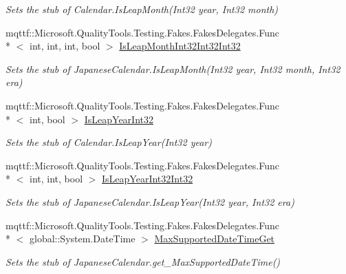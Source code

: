 \begin{DoxyCompactItemize}
\begin{DoxyCompactList}\small\item\em Sets the stub of Calendar.\-Is\-Leap\-Month(\-Int32 year, Int32 month)\end{DoxyCompactList}\item 
mqttf\-::\-Microsoft.\-Quality\-Tools.\-Testing.\-Fakes.\-Fakes\-Delegates.\-Func\\*
$<$ int, int, int, bool $>$ \hyperlink{class_system_1_1_globalization_1_1_fakes_1_1_stub_japanese_calendar_a881990b2e554e0de19a3dc76a23b2a61}{Is\-Leap\-Month\-Int32\-Int32\-Int32}
\begin{DoxyCompactList}\small\item\em Sets the stub of Japanese\-Calendar.\-Is\-Leap\-Month(\-Int32 year, Int32 month, Int32 era)\end{DoxyCompactList}\item 
mqttf\-::\-Microsoft.\-Quality\-Tools.\-Testing.\-Fakes.\-Fakes\-Delegates.\-Func\\*
$<$ int, bool $>$ \hyperlink{class_system_1_1_globalization_1_1_fakes_1_1_stub_japanese_calendar_ab1f0aa6c476804ff4102ee1860db8593}{Is\-Leap\-Year\-Int32}
\begin{DoxyCompactList}\small\item\em Sets the stub of Calendar.\-Is\-Leap\-Year(\-Int32 year)\end{DoxyCompactList}\item 
mqttf\-::\-Microsoft.\-Quality\-Tools.\-Testing.\-Fakes.\-Fakes\-Delegates.\-Func\\*
$<$ int, int, bool $>$ \hyperlink{class_system_1_1_globalization_1_1_fakes_1_1_stub_japanese_calendar_a3cf93b52b90cd9e36d9d6d2b6b4292cf}{Is\-Leap\-Year\-Int32\-Int32}
\begin{DoxyCompactList}\small\item\em Sets the stub of Japanese\-Calendar.\-Is\-Leap\-Year(\-Int32 year, Int32 era)\end{DoxyCompactList}\item 
mqttf\-::\-Microsoft.\-Quality\-Tools.\-Testing.\-Fakes.\-Fakes\-Delegates.\-Func\\*
$<$ global\-::\-System.\-Date\-Time $>$ \hyperlink{class_system_1_1_globalization_1_1_fakes_1_1_stub_japanese_calendar_a1e565991c545d6f099849c8d8c14e859}{Max\-Supported\-Date\-Time\-Get}
\begin{DoxyCompactList}\small\item\em Sets the stub of Japanese\-Calendar.\-get\-\_\-\-Max\-Supported\-Date\-Time()\end{DoxyCompactList}\item 

\end{DoxyCompactItemize}
